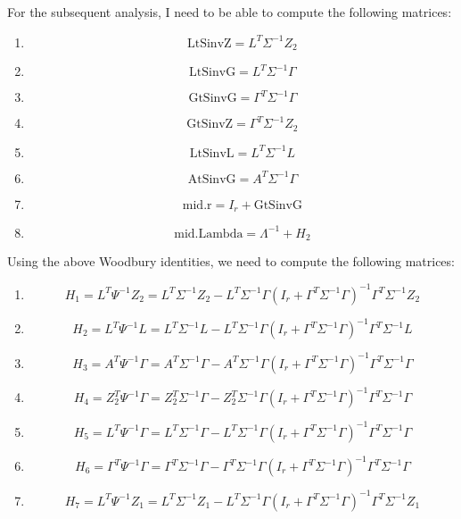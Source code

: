 \documentclass{article}
\begin{document}
For the subsequent analysis, I need to be able to compute the following matrices:
\begin{enumerate}
\item \[
\text{LtSinvZ} = L^T \Sigma^{-1}Z_2
\]
\item \[
\text{LtSinvG} = L^T \Sigma^{-1} \Gamma
\]
\item \[
\text{GtSinvG} = \Gamma^T \Sigma^{-1} \Gamma
\]
\item \[
\text{GtSinvZ} = \Gamma^T \Sigma^{-1} Z_2
\]
\item \[
\text{LtSinvL} = L^T \Sigma^{-1}L
\]
\item \[
\text{AtSinvG} = A^T \Sigma^{-1}\Gamma
\]
\item \[
\text{mid.r} = I_r + \text{GtSinvG}
\]
\item \[
\text{mid.Lambda} = \Lambda^{-1} + H_2
\]
\end{enumerate}

Using the above Woodbury identities, we need to compute the following matrices:
\begin{enumerate}
\item \[
H_1 = L^T \Psi^{-1}Z_2 = L^T\Sigma^{-1}Z_2 - L^T\Sigma^{-1}\Gamma\left( I_r + \Gamma^T \Sigma^{-1}\Gamma \right)^{-1}\Gamma^T \Sigma^{-1}Z_2
\]
\item \[
H_2 = L^T \Psi^{-1}L = L^T\Sigma^{-1}L - L^T\Sigma^{-1}\Gamma\left( I_r + \Gamma^T \Sigma^{-1}\Gamma \right)^{-1}\Gamma^T \Sigma^{-1}L
\]
\item \[
H_3 = A^T \Psi^{-1}\Gamma = A^T\Sigma^{-1}\Gamma - A^T\Sigma^{-1}\Gamma\left( I_r + \Gamma^T \Sigma^{-1}\Gamma \right)^{-1}\Gamma^T \Sigma^{-1}\Gamma
\]
\item \[
H_4 = Z_2^T \Psi^{-1}\Gamma = Z_2^T\Sigma^{-1}\Gamma - Z_2^T\Sigma^{-1}\Gamma\left( I_r + \Gamma^T \Sigma^{-1}\Gamma \right)^{-1}\Gamma^T \Sigma^{-1}\Gamma
\]
\item \[
H_5 = L^T \Psi^{-1}\Gamma = L^T\Sigma^{-1}\Gamma - L^T\Sigma^{-1}\Gamma\left( I_r + \Gamma^T \Sigma^{-1}\Gamma \right)^{-1}\Gamma^T \Sigma^{-1}\Gamma
\]
\item \[
H_6 = \Gamma^T \Psi^{-1} \Gamma = \Gamma^T\Sigma^{-1}\Gamma - \Gamma^T\Sigma^{-1}\Gamma\left( I_r + \Gamma^T \Sigma^{-1}\Gamma \right)^{-1}\Gamma^T \Sigma^{-1}\Gamma
\]
\item \[
H_7 = L^T \Psi^{-1}Z_1 = L^T\Sigma^{-1}Z_1 - L^T\Sigma^{-1}\Gamma\left( I_r + \Gamma^T \Sigma^{-1}\Gamma \right)^{-1}\Gamma^T \Sigma^{-1}Z_1
\]

\end{enumerate}
\end{document}
